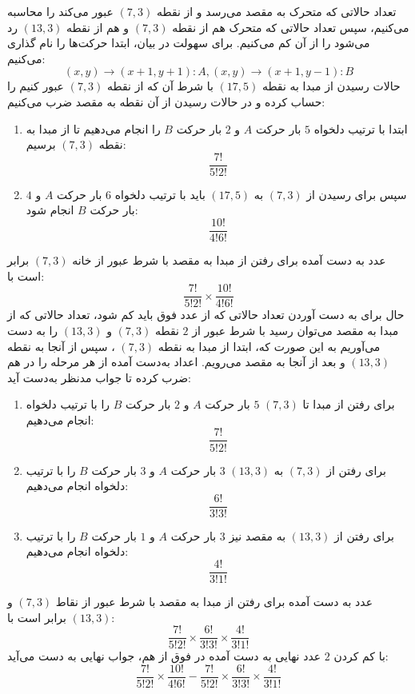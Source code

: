 \p
تعداد حالاتی که متحرک به مقصد می‌رسد و از نقطه 
$(7, 3)$ 
عبور می‌کند را محاسبه می‌کنیم، سپس تعداد حالاتی که متحرک هم از نقطه
$(7, 3)$ 
و هم از نقطه 
$(13, 3)$ 
رد می‌شود را از آن کم می‌کنیم. برای سهولت در بیان، ابتدا حرکت‌ها را نام گذاری می‌کنیم:
$$(x ,y) \to (x + 1, y + 1) : A , (x, y) \to (x + 1, y - 1) : B$$
   حالات رسیدن از مبدا به نقطه
$(17, 5)$
     با شرط آن که از نقطه
$(7, 3)$
      عبور کنیم را حساب کرده و در حالات رسیدن از آن نقطه به مقصد ضرب می‌کنیم:
    \begin{enumerate}
        \item 
        ابتدا با ترتیب دلخواه 
$5$ 
         بار حرکت 
$A$
          و
$2$ 
          بار حرکت 
$B$
           را انجام می‌دهیم تا از مبدا به نقطه 
$(7,3)$
           برسیم:
$$\frac{7!}{5!2!}$$
        \item
        سپس برای رسیدن از 
$(7, 3)$
         به 
$(17,5)$ 
        باید با ترتیب دلخواه
$6$ 
        بار حرکت 
$A$ 
        و 
$4$ 
        بار حرکت
$B$ 
        انجام شود:
$$\frac{10!}{4!6!}$$
    \end{enumerate}
    عدد به دست آمده برای رفتن از مبدا به مقصد با شرط عبور از خانه
$(7, 3)$ 
     برابر است با:
$$\frac{7!}{5!2!}\times\frac{10!}{4!6!}$$
    حال برای به دست آوردن تعداد حالاتی که از عدد فوق باید کم شود، تعداد حالاتی که از مبدا به مقصد می‌توان رسید با شرط عبور از
$2$ 
    نقطه
$(7, 3)$ 
    و
$(13, 3)$ 
     را به دست می‌آوریم به این صورت که، ابتدا از مبدا به نقطه
$(7, 3)$ 
، سپس از آنجا به نقطه
$(13, 3)$ 
     و بعد از آنجا به مقصد می‌رویم. اعداد به‌دست آمده از هر مرحله را در هم ضرب کرده تا جواب مدنظر به‌دست آید:
    \begin{enumerate}
        \item 
        برای رفتن از مبدا تا 
$(7, 3)$
$5$
          بار حرکت
$A$ 
           و
$2$ 
            بار حرکت
$B$ 
            را با ترتیب دلخواه انجام می‌دهیم:
$$\frac{7!}{5!2!}$$
        \item
        برای رفتن از 
$(7, 3)$ 
        به 
$(13, 3)$
$3$
          بار حرکت 
$A$ 
          و
$3$
           بار حرکت
$B$
            را با ترتیب دلخواه انجام می‌دهیم:
$$\frac{6!}{3!3!}$$
        \item
        برای رفتن از
$(13, 3)$
         به مقصد نیز 
$3$ 
         بار حرکت
$A$
         و
$1$ 
          بار حرکت
$B$
            را با ترتیب دلخواه انجام می‌دهیم: 
$$\frac{4!}{3!1!}$$
    \end{enumerate}
    عدد به دست آمده برای رفتن از مبدا به مقصد با شرط عبور از نقاط 
$(7, 3)$ 
    و 
$(13, 3)$ 
    برابر است با:
$$\frac{7!}{5!2!}\times\frac{6!}{3!3!}\times\frac{4!}{3!1!}$$
    با کم کردن 
$2$ 
    عدد نهایی به دست آمده در فوق از هم، جواب نهایی به دست می‌آید:
    $$\frac{7!}{5!2!}\times\frac{10!}{4!6!} - \frac{7!}{5!2!}\times\frac{6!}{3!3!}\times\frac{4!}{3!1!}$$